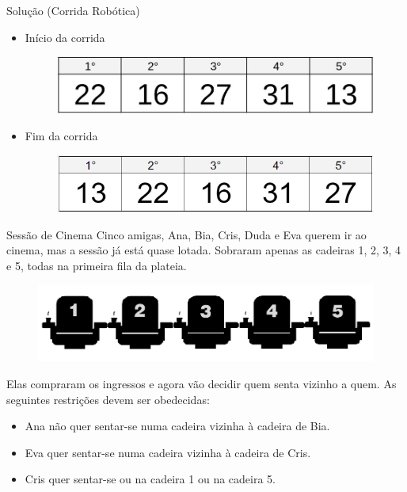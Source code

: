 \documentclass{beamer}
\begin{document}
\begin{frame}{Solução (Corrida Robótica)}
\begin{itemize}
    \item Início da corrida
        \begin{figure}[ht]
        \centering
        \includegraphics[width=.6\textwidth]{1.jpeg}
        \label{fig:exampleFig2}
        \end{figure}
        \item Fim da corrida
        \begin{figure}[ht]
        \centering
        \includegraphics[width=.6\textwidth]{fimm.png}
        \label{fig:exampleFig2}
        \end{figure}
        
\end{itemize}
\end{frame}
\begin{frame}{Sessão de Cinema}
Cinco amigas, Ana, Bia, Cris, Duda e Eva querem ir ao cinema, mas a sessão já está quase lotada. Sobraram apenas as cadeiras 1, 2, 3, 4 e 5, todas na primeira fila da plateia.
        \begin{figure}[ht]
        \centering
        \includegraphics[width=.9\textwidth]{cadeiras.png}
        \label{fig:exampleFig2}
        \end{figure}
        Elas compraram os ingressos e agora vão decidir quem senta vizinho a quem. As seguintes restrições devem ser obedecidas:
\begin{itemize}
    \item Ana não quer sentar-se numa cadeira vizinha à cadeira de Bia.
    \item Eva quer sentar-se numa cadeira vizinha à cadeira de Cris.
    \item Cris quer sentar-se ou na cadeira 1 ou na cadeira 5.

\end{itemize}
\end{frame}
\end{document}

